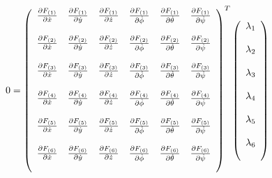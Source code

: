 \begin{equation}
    0 = \left(
    \begin{array}{c c c c c c}
    \frac{\partial F_{(1)}}{\partial \dot x} & \frac{\partial F_{(1)}}{\partial \dot y} & \frac{\partial F_{(1)}}{\partial \dot z} & \frac{\partial F_{(1)}}{\partial \dot \phi} & \frac{\partial F_{(1)}}{\partial \dot \theta} & \frac{\partial F_{(1)}}{\partial \dot \psi}\\\\

    \frac{\partial F_{(2)}}{\partial \dot x} & \frac{\partial F_{(2)}}{\partial \dot y} & \frac{\partial F_{(2)}}{\partial \dot z} & \frac{\partial F_{(2)}}{\partial \dot \phi} & \frac{\partial F_{(2)}}{\partial \dot \theta} & \frac{\partial F_{(2)}}{\partial \dot \psi}\\\\

    \frac{\partial F_{(3)}}{\partial \dot x} & \frac{\partial F_{(3)}}{\partial \dot y} & \frac{\partial F_{(3)}}{\partial \dot z} & \frac{\partial F_{(3)}}{\partial \dot \phi} & \frac{\partial F_{(3)}}{\partial \dot \theta} & \frac{\partial F_{(3)}}{\partial \dot \psi}\\\\

    \frac{\partial F_{(4)}}{\partial \dot x} & \frac{\partial F_{(4)}}{\partial \dot y} & \frac{\partial F_{(4)}}{\partial \dot z} & \frac{\partial F_{(4)}}{\partial \dot \phi} & \frac{\partial F_{(4)}}{\partial \dot \theta} & \frac{\partial F_{(4)}}{\partial \dot \psi}\\\\

    \frac{\partial F_{(5)}}{\partial \dot x} & \frac{\partial F_{(5)}}{\partial \dot y} & \frac{\partial F_{(5)}}{\partial \dot z} & \frac{\partial F_{(5)}}{\partial \dot \phi} & \frac{\partial F_{(5)}}{\partial \dot \theta} & \frac{\partial F_{(5)}}{\partial \dot \psi}\\\\

    \frac{\partial F_{(6)}}{\partial \dot x} & \frac{\partial F_{(6)}}{\partial \dot y} & \frac{\partial F_{(6)}}{\partial \dot z} & \frac{\partial F_{(6)}}{\partial \dot \phi} & \frac{\partial F_{(6)}}{\partial \dot \theta} & \frac{\partial F_{(6)}}{\partial \dot \psi}\\\\

    \end{array}\right)^T\left(
    \begin{array}{c}
    \lambda_1\\\\
    \lambda_2\\\\
    \lambda_3\\\\
    \lambda_4\\\\
    \lambda_5\\\\
    \lambda_6\\\\
    \end{array}\right)
\end{equation}



